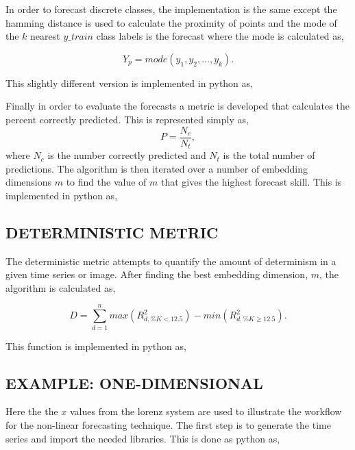 In order to forecast discrete classes, the implementation is the same except the hamming distance is used to calculate the proximity of points and the mode of the $k$ nearest $y\_train$ class labels is the forecast where the mode is calculated as,

$$ Y_{p} = mode(y_{1}, y_{2}, \dots,  y_k). $$

This slightly different version is implemented in python as,





Finally in order to evaluate the forecasts a metric is developed that calculates the percent correctly predicted. This is represented simply as,
$$ P = \frac{ N_c} {N_t}, $$
where $N_c$ is the number correctly predicted and $N_t$ is the total number of predictions. The algorithm is then iterated over a number of embedding dimensions $m$ to find the value of $m$ that gives the highest forecast skill. This is implemented in python as,




\subsection{DETERMINISTIC METRIC}

The deterministic metric attempts to quantify the amount of determinism in a given time series or image. After finding the best embedding dimension, $m$, the algorithm is calculated as,

$$ D = \sum^n_{d=1} max(R^2_{d,\%K<12.5}) - min(R^2_{d,\%K\geq12.5}). $$

This function is implemented in python as,





\subsection{EXAMPLE: ONE-DIMENSIONAL}

Here the the $x$ values from the lorenz system are used to illustrate the workflow for the non-linear forecasting technique. The first step is to generate the time series and import the needed libraries. This is done as python as,

